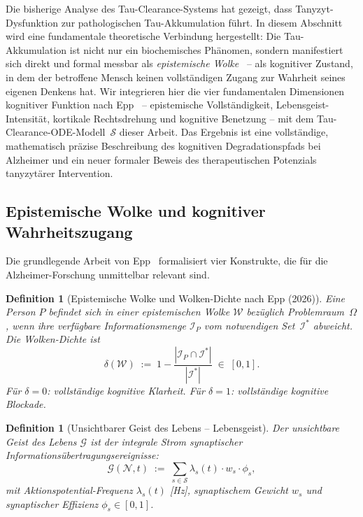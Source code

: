 ﻿\documentclass[12pt,a4paper]{article}
\newtheorem{definition}[theorem]{Definition}
\theoremstyle{definition}
\begin{document}
	Die bisherige Analyse des Tau-Clearance-Systems hat gezeigt, dass Tanyzyt-Dysfunktion
	zur pathologischen Tau-Akkumulation führt. In diesem Abschnitt wird eine fundamentale
	theoretische Verbindung hergestellt: Die Tau-Akkumulation ist nicht nur ein biochemisches
	Phänomen, sondern manifestiert sich direkt und formal messbar als \emph{epistemische
	Wolke}~\cite{Epp2026brn} -- als kognitiver Zustand, in dem der betroffene Mensch keinen
	vollständigen Zugang zur Wahrheit seines eigenen Denkens hat. Wir integrieren hier die
	vier fundamentalen Dimensionen kognitiver Funktion nach Epp~\cite{Epp2026brn} --
	epistemische Vollständigkeit, Lebensgeist-Intensität, kortikale Rechtsdrehung und
	kognitive Benetzung -- mit dem Tau-Clearance-ODE-Modell~$\mathcal{S}$ dieser Arbeit.
	Das Ergebnis ist eine vollständige, mathematisch präzise Beschreibung des kognitiven
	Degradationspfads bei Alzheimer und ein neuer formaler Beweis des therapeutischen
	Potenzials tanyzytärer Intervention.

	\subsection{Epistemische Wolke und kognitiver Wahrheitszugang}

	Die grundlegende Arbeit von Epp~\cite{Epp2026brn} formalisiert vier Konstrukte, die für
	die Alzheimer-Forschung unmittelbar relevant sind.

	\begin{definition}[Epistemische Wolke und Wolken-Dichte nach Epp (2026)]
		\label{def:epist_wolke}
		Eine Person $P$ befindet sich in einer \emph{epistemischen Wolke} $\mathcal{W}$
		bezüglich Problemraum~$\Omega$, wenn ihre verfügbare Informationsmenge
		$\mathcal{I}_P$ vom notwendigen Set~$\mathcal{I}^*$ abweicht. Die
		\emph{Wolken-Dichte} ist
		\[
			\delta(\mathcal{W}) \;:=\; 1 - \frac{|\mathcal{I}_P \cap \mathcal{I}^*|}{|\mathcal{I}^*|}
			\;\in\; [0,1].
		\]
		Für $\delta = 0$: vollständige kognitive Klarheit. Für $\delta = 1$: vollständige
		kognitive Blockade.
	\end{definition}

	\begin{definition}[Unsichtbarer Geist des Lebens -- Lebensgeist]
		\label{def:lebensgeist}
		Der \emph{unsichtbare Geist des Lebens} $\mathcal{G}$ ist der integrale Strom
		synaptischer Informationsübertragungsereignisse:
		\[
			\mathcal{G}(\mathcal{N}, t) \;:=\; \sum_{s \in \mathcal{S}}
			\lambda_s(t) \cdot w_s \cdot \phi_s,
		\]
		mit Aktionspotential-Frequenz $\lambda_s(t)$ [Hz], synaptischem Gewicht $w_s$ und
		synaptischer Effizienz $\phi_s \in [0,1]$.
	\end{definition}
\end{document}
